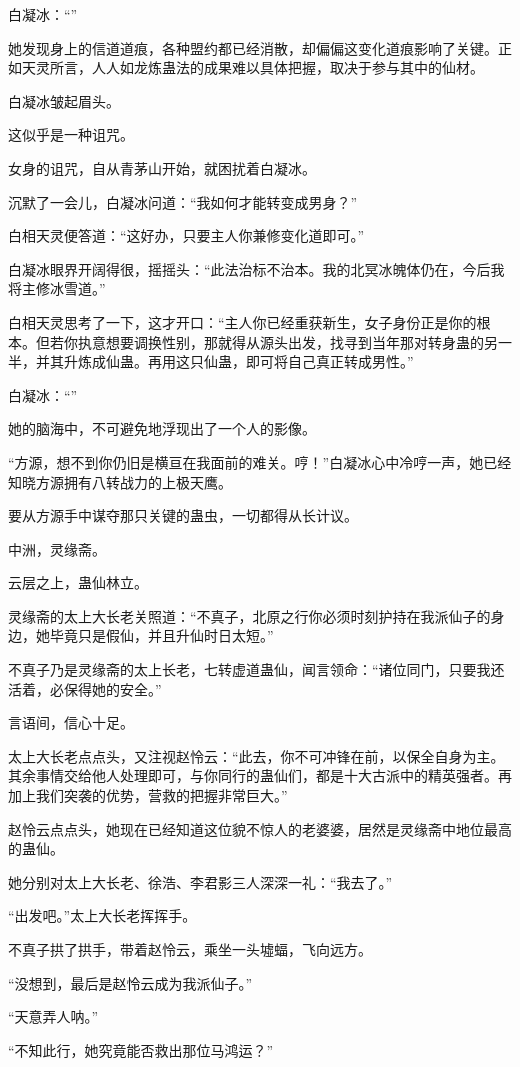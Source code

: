 \begin{this_body}
白凝冰：“”

她发现身上的信道道痕，各种盟约都已经消散，却偏偏这变化道痕影响了关键。正如天灵所言，人人如龙炼蛊法的成果难以具体把握，取决于参与其中的仙材。

白凝冰皱起眉头。

这似乎是一种诅咒。

女身的诅咒，自从青茅山开始，就困扰着白凝冰。

沉默了一会儿，白凝冰问道：“我如何才能转变成男身？”

白相天灵便答道：“这好办，只要主人你兼修变化道即可。”

白凝冰眼界开阔得很，摇摇头：“此法治标不治本。我的北冥冰魄体仍在，今后我将主修冰雪道。”

白相天灵思考了一下，这才开口：“主人你已经重获新生，女子身份正是你的根本。但若你执意想要调换性别，那就得从源头出发，找寻到当年那对转身蛊的另一半，并其升炼成仙蛊。再用这只仙蛊，即可将自己真正转成男性。”

白凝冰：“”

她的脑海中，不可避免地浮现出了一个人的影像。

“方源，想不到你仍旧是横亘在我面前的难关。哼！”白凝冰心中冷哼一声，她已经知晓方源拥有八转战力的上极天鹰。

要从方源手中谋夺那只关键的蛊虫，一切都得从长计议。

中洲，灵缘斋。

云层之上，蛊仙林立。

灵缘斋的太上大长老关照道：“不真子，北原之行你必须时刻护持在我派仙子的身边，她毕竟只是假仙，并且升仙时日太短。”

不真子乃是灵缘斋的太上长老，七转虚道蛊仙，闻言领命：“诸位同门，只要我还活着，必保得她的安全。”

言语间，信心十足。

太上大长老点点头，又注视赵怜云：“此去，你不可冲锋在前，以保全自身为主。其余事情交给他人处理即可，与你同行的蛊仙们，都是十大古派中的精英强者。再加上我们突袭的优势，营救的把握非常巨大。”

赵怜云点点头，她现在已经知道这位貌不惊人的老婆婆，居然是灵缘斋中地位最高的蛊仙。

她分别对太上大长老、徐浩、李君影三人深深一礼：“我去了。”

“出发吧。”太上大长老挥挥手。

不真子拱了拱手，带着赵怜云，乘坐一头墟蝠，飞向远方。

“没想到，最后是赵怜云成为我派仙子。”

“天意弄人呐。”

“不知此行，她究竟能否救出那位马鸿运？”


\end{this_body}
